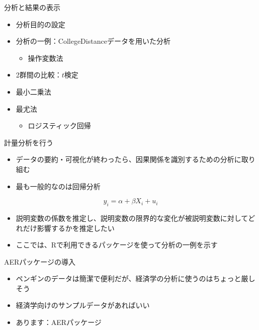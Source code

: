 \documentclass[
  ignorenonframetext,
]{beamer}
\providecommand{\tightlist}{%
  \setlength{\itemsep}{0pt}\setlength{\parskip}{0pt}}
\begin{document}
\begin{frame}[fragile]{分析と結果の表示}
\protect\hypertarget{ux5206ux6790ux3068ux7d50ux679cux306eux8868ux793a}{}
\begin{itemize}
\tightlist
\item
  分析目的の設定
\item
  分析の一例：CollegeDistanceデータを用いた分析

  \begin{itemize}
  \tightlist
  \item
    操作変数法
  \end{itemize}
\item
  2群間の比較：\(t\)検定
\item
  最小二乗法
\item
  最尤法

  \begin{itemize}
  \tightlist
  \item
    ロジスティック回帰
  \end{itemize}
\end{itemize}

\begin{block}{計量分析を行う}
\protect\hypertarget{ux8a08ux91cfux5206ux6790ux3092ux884cux3046}{}
\begin{itemize}
\tightlist
\item
  データの要約・可視化が終わったら、因果関係を識別するための分析に取り組む
\item
  最も一般的なのは回帰分析
\end{itemize}

\[y_{i} = \alpha + \beta X_i + u_i\]

\begin{itemize}
\tightlist
\item
  説明変数の係数を推定し、説明変数の限界的な変化が被説明変数に対してどれだけ影響するかを推定したい
\item
  ここでは、Rで利用できるパッケージを使って分析の一例を示す
\end{itemize}
\end{block}

\begin{block}{AERパッケージの導入}
\protect\hypertarget{aerux30d1ux30c3ux30b1ux30fcux30b8ux306eux5c0eux5165}{}
\begin{itemize}
\tightlist
\item
  ペンギンのデータは簡潔で便利だが、経済学の分析に使うのはちょっと厳しそう
\item
  経済学向けのサンプルデータがあればいい
\item
  あります：AERパッケージ


\end{itemize}
\end{block}
\end{frame}
\end{document}
